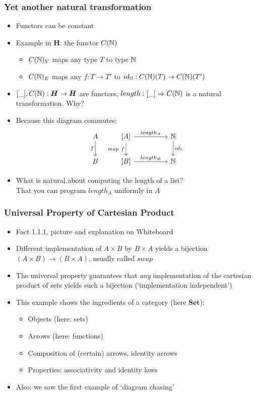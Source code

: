 \documentclass[handout]{beamer}
\newcommand{\To}{\Rightarrow}
\newcommand{\bfsf}[1]{{\boldsymbol{#1}}}
\newcommand{\Set}{\bfsf{Set}}
\newcommand{\HH}{\bfsf{H}}
\begin{document}
\frame
  {   
    \frametitle{Yet another natural transformation}\label{Ch3:length}

 \begin{itemize}[<+->]
\item Functors can be constant
\item Example in $\HH$: the functor $C(\mathbb{N})$ 
   \begin{itemize}[<+->]
\item $C(\mathbb{N})_V$ maps any type $T$ to type $\mathbb{N}$
\item $C(\mathbb{N})_E$ maps any $f: T\to T'$ to $id_{\mathbb{N}}: C(\mathbb{N})(T) \to C(\mathbb{N})(T')$
   \end{itemize}
\item $[\_],C(\nat):\HH\to\HH$ are functors, $length: [\_] \To C(\nat)$ 
is a natural transformation. Why?
\item Because this diagram commutes:
\[
\begin{tikzcd}[ampersand replacement=\&]
A \arrow[swap]{d}{f} \& {[A]}  \arrow[swap]{d}{map~f}\arrow{rr}{length_A} \&\& \nat \arrow{d}{id_\nat}\\
B \& {[B]}  \arrow{rr}{length_B}\& \& \nat
\end{tikzcd}
\]
\item What is natural about computing the length of a list?\\
That you can program $length_A$ uniformly in $A$
 \end{itemize}

 }


\frame
  {   
    \frametitle{Universal Property of Cartesian Product}\label{Ch3:CartesianProductUP}

 \begin{itemize}[<+->]
\item Fact 1.1.1, picture and explanation on Whiteboard
\item Different implementation of $A\times B$ by $B\times A$ yields a bijection
$(A\times B) \to (B\times A)$, usually called $swap$
\item The universal property guarantees that \emph{any} implementation
of the cartesian product of sets yields such a bijection (`implementation independent')
\item This example shows the ingredients of a category (here $\Set$):
   \begin{itemize}[<+->]
\item Objects (here: sets)
\item Arrows (here: functions)
\item Composition of (certain) arrows, identity arrows
\item Properties: associativity and identity laws
   \end{itemize}
\item Also: we saw the first example of `diagram chasing'
 \end{itemize}

 }
\end{document}
